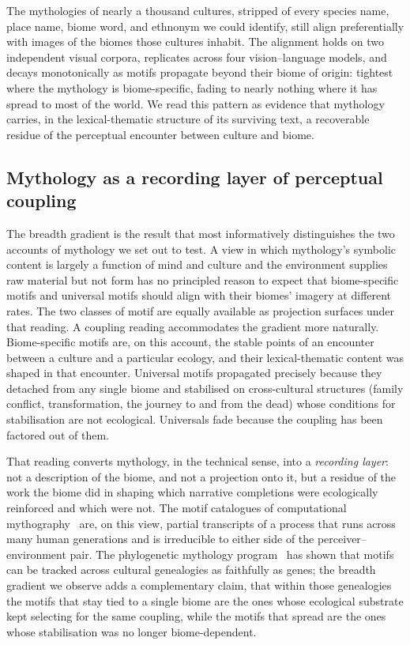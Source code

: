 \documentclass[11pt,a4paper]{article}
\begin{document}
The mythologies of nearly a thousand cultures, stripped of every
species name, place name, biome word, and ethnonym we could
identify, still align preferentially with images of the biomes
those cultures inhabit. The alignment holds on two independent
visual corpora, replicates across four vision--language models,
and decays monotonically as motifs propagate beyond their biome of
origin: tightest where the mythology is biome-specific, fading to
nearly nothing where it has spread to most of the world. We read
this pattern as evidence that mythology carries, in the
lexical-thematic structure of its surviving text, a recoverable
residue of the perceptual encounter between culture and biome.

\subsection*{Mythology as a recording layer of perceptual coupling}

The breadth gradient is the result that most informatively
distinguishes the two accounts of mythology we set out to test. A
view in which mythology's symbolic content is largely a function
of mind and culture and the environment supplies raw material but
not form has no principled reason to expect that biome-specific
motifs and universal motifs should align with their biomes'
imagery at different rates. The two classes of motif are equally
available as projection surfaces under that reading. A coupling
reading accommodates the gradient more naturally. Biome-specific
motifs are, on this account, the stable points of an encounter
between a culture and a particular ecology, and their
lexical-thematic content was shaped in that encounter. Universal
motifs propagated precisely because they detached from any single
biome and stabilised on cross-cultural structures (family
conflict, transformation, the journey to and from the dead)
whose conditions for stabilisation are not ecological. Universals
fade because the coupling has been factored out of them.

That reading converts mythology, in the technical sense, into a
\emph{recording layer}: not a description of the biome, and not a
projection onto it, but a residue of the work the biome did in
shaping which narrative completions were ecologically reinforced
and which were not. The motif catalogues of computational
mythography~\citep{berezkin2024catalogue,dhuy2018large,tehrani2013phylogeny}
are, on this view, partial transcripts of a process that runs
across many human generations and is irreducible to either side
of the perceiver--environment pair. The phylogenetic mythology
program~\citep{tehrani2013phylogeny,dhuy2016phylogenetic} has
shown that motifs can be tracked across cultural genealogies as
faithfully as genes; the breadth gradient we observe adds a
complementary claim, that within those genealogies the motifs
that stay tied to a single biome are the ones whose ecological
substrate kept selecting for the same coupling, while the motifs
that spread are the ones whose stabilisation was no longer
biome-dependent.
\end{document}
